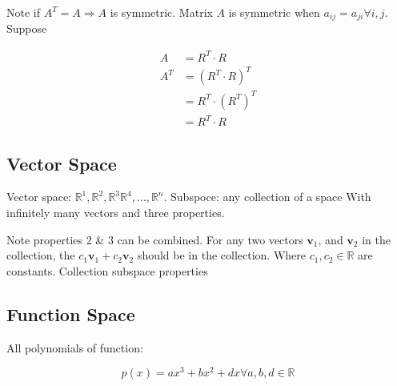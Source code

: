 \documentclass[main.tex]{subfiles}
\begin{document}
    Note if $A^{T} = A \Rightarrow A$ is symmetric. Matrix $A$ is symmetric when $a_{ij}=a_{ji} \forall i, j$. Suppose

    $$
    \begin{aligned}
    A & = R^{T} \cdot R\\
    A^{T} & = \left(R^{T} \cdot R\right)^{T}\\
    & = R^{T} \cdot \left(R^{T}\right)^{T} \\
    & =R^{T} \cdot R
    \end{aligned}
    $$

\subsection{Vector Space}

    Vector space: $\mathbb{R}^{1}, \mathbb{R}^{2}, \mathbb{R}^{3} \mathbb{R}^{4}, \dots, \mathbb{R}^{n}$. Subspoce: any collection of a space With infinitely many vectors and three properties.


    Note properties 2 & 3 can be combined. For any two vectors $_1$, and $_2$ in the collection, the $c_{1} _1 + c_{2} _2$ should be in the collection. Where $c_{1}, c_{2} \in {}$ are constants. Collection subspace properties

\subsection{Function Space}

    All polynomials of  function:
    
    $$
    p(x) = a x^{3}+ b x^{2}+ d x \forall a, b, d \in \mathbb{R}
    $$
        
\end{document}
